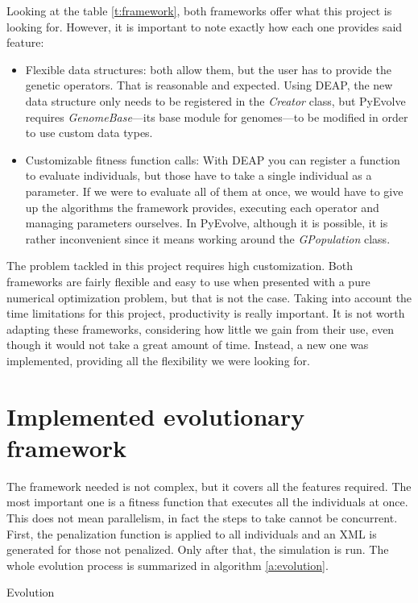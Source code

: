 Looking at the table \ref{t:framework}, both frameworks offer what this project is looking for. However, it is important to note exactly how each one provides said feature:

\begin{itemize}
	\item Flexible data structures: both allow them, but the user has to provide the genetic operators. That is reasonable and expected. Using DEAP, the new data structure only needs to be registered in the \textit{Creator} class, but PyEvolve requires \textit{GenomeBase}---its base module for genomes---to be modified in order to use custom data types.
	\item Customizable fitness function calls: With DEAP you can register a function to evaluate individuals, but those have to take a single individual as a parameter. If we were to evaluate all of them at once, we would have to give up the algorithms the framework provides, executing each operator and managing parameters ourselves. In PyEvolve, although it is possible, it is rather inconvenient since it means working around the \textit{GPopulation} class.
\end{itemize}

The problem tackled in this project requires high customization. Both frameworks are fairly flexible and easy to use when presented with a pure numerical optimization problem, but that is not the case. Taking into account the time limitations for this project, productivity is really important. It is not worth adapting these frameworks, considering how little we gain from their use, even though it would not take a great amount of time. Instead, a new one was implemented, providing all the flexibility we were looking for.

\section{Implemented evolutionary framework}

The framework needed is not complex, but it covers all the features required. The most important one is a fitness function that executes all the individuals at once. This does not mean parallelism, in fact the steps to take cannot be concurrent. First, the penalization function is applied to all individuals and an XML is generated for those not penalized. Only after that, the simulation is run. The whole evolution process is summarized in algorithm \ref{a:evolution}.


\begin{algorithm}
	\caption{Evolution}
	\label{a:evolution}
\end{algorithm}

